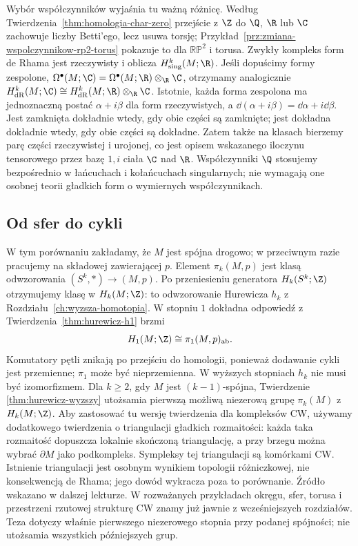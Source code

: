 Wybór współczynników wyjaśnia tu ważną różnicę.
Według Twierdzenia~\ref{thm:homologia-char-zero}
przejście z $\Z$ do $\Q$, $\R$ lub $\C$
zachowuje liczby Betti'ego, lecz usuwa torsję;
Przykład~\ref{prz:zmiana-wspolczynnikow-rp2-torus}
pokazuje to dla $\mathbb{RP}^2$ i torusa.
Zwykły kompleks form de Rhama jest rzeczywisty
i oblicza $H^k_{\mathrm{sing}}(M;\R)$.
Jeśli dopuścimy formy zespolone,
$\Omega^\bullet(M;\C)
=\Omega^\bullet(M;\R)\otimes_{\R}\C$,
otrzymamy analogicznie
$H^k_{\mathrm{dR}}(M;\C)
\cong H^k_{\mathrm{dR}}(M;\R)\otimes_{\R}\C$.
Istotnie, każda forma zespolona ma jednoznaczną postać
$\alpha+i\beta$ dla form rzeczywistych, a
$\dd(\alpha+i\beta)=\dd\alpha+i\dd\beta$.
Jest zamknięta dokładnie wtedy, gdy obie części są zamknięte;
jest dokładna dokładnie wtedy, gdy obie części są dokładne.
Zatem także na klasach bierzemy parę części rzeczywistej i urojonej,
co jest opisem wskazanego iloczynu tensorowego przez bazę $1,i$ ciała $\C$ nad $\R$.
Współczynniki $\Q$ stosujemy bezpośrednio
w łańcuchach i kołańcuchach singularnych;
nie wymagają one osobnej teorii gładkich
form o wymiernych współczynnikach.

\subsection*{Od sfer do cykli}

W tym porównaniu zakładamy, że $M$ jest spójna drogowo;
w przeciwnym razie pracujemy na składowej zawierającej $p$.
Element $\pi_k(M,p)$ jest klasą odwzorowania
$(S^k,*)\to(M,p)$. Po przeniesieniu generatora
$H_k(S^k;\Z)$ otrzymujemy klasę w $H_k(M;\Z)$:
to odwzorowanie Hurewicza $h_k$
z Rozdziału~\ref{ch:wyzsza-homotopia}.
W stopniu $1$ dokładna odpowiedź z
Twierdzenia~\ref{thm:hurewicz-h1} brzmi
\[
 H_1(M;\Z)\cong\pi_1(M,p)_{\mathrm{ab}}.
\]
Komutatory pętli znikają po przejściu
do homologii, ponieważ dodawanie cykli
jest przemienne; $\pi_1$ może być nieprzemienna.
W wyższych stopniach $h_k$ nie musi być
izomorfizmem. Dla $k\geq2$, gdy $M$ jest
$(k-1)$-spójna, Twierdzenie
\ref{thm:hurewicz-wyzszy} utożsamia
pierwszą możliwą niezerową grupę
$\pi_k(M)$ z $H_k(M;\Z)$.
Aby zastosować tu wersję twierdzenia dla kompleksów CW,
używamy dodatkowego twierdzenia o triangulacji gładkich
rozmaitości: każda taka rozmaitość dopuszcza lokalnie
skończoną triangulację, a przy brzegu można wybrać
$\partial M$ jako podkompleks. Sympleksy tej triangulacji
są komórkami CW. Istnienie triangulacji jest osobnym
wynikiem topologii różniczkowej, nie konsekwencją de Rhama;
jego dowód wykracza poza to porównanie. Źródło wskazano
w dalszej lekturze. W rozważanych przykładach okręgu,
sfer, torusa i przestrzeni rzutowej strukturę CW znamy
już jawnie z wcześniejszych rozdziałów.
Teza dotyczy właśnie pierwszego
niezerowego stopnia przy podanej spójności;
nie utożsamia wszystkich późniejszych grup.

